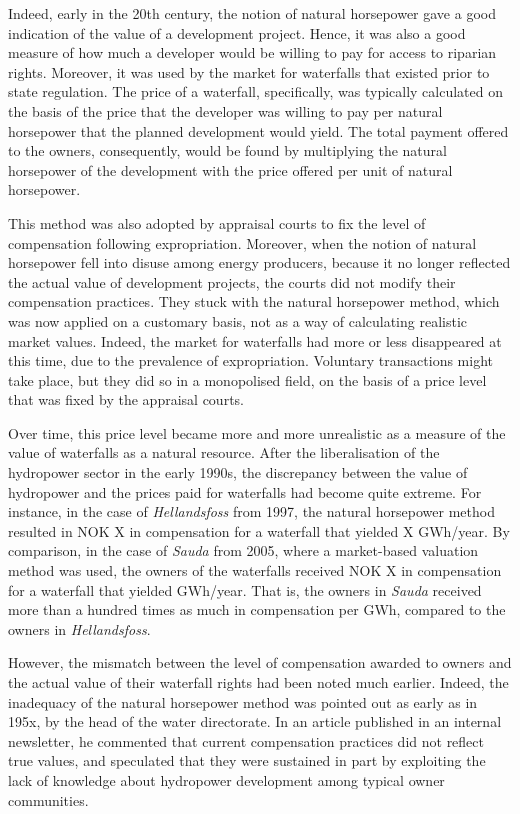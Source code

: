 Indeed, early in the 20th century, the notion of natural horsepower gave a good indication of the value of a development project. Hence, it was also a good measure of how much a developer would be willing to pay for access to riparian rights. Moreover, it was used by the market for waterfalls that existed prior to state regulation. The price of a waterfall, specifically, was typically calculated on the basis of the price that the developer was willing to pay per natural horsepower that the planned development would yield. The total payment offered to the owners, consequently, would be found by multiplying the natural horsepower of the development with the price offered per unit of natural horsepower.

This method was also adopted by appraisal courts to fix the level of compensation following expropriation. Moreover, when the notion of natural horsepower fell into disuse among energy producers, because it no longer reflected the actual value of development projects, the courts did not modify their compensation practices. They stuck with the natural horsepower method, which was now applied on a customary basis, not as a way of calculating realistic market values. Indeed, the market for waterfalls had more or less disappeared at this time, due to the prevalence of expropriation. Voluntary transactions might take place, but they did so in a monopolised field, on the basis of a price level that was fixed by the appraisal courts.

Over time, this price level became more and more unrealistic as a measure of the value of waterfalls as a natural resource. After the liberalisation of the hydropower sector in the early 1990s, the discrepancy between the value of hydropower and the prices paid for waterfalls had become quite extreme. For instance, in the case of {\it Hellandsfoss} from 1997, the natural horsepower method resulted in NOK X in compensation for a waterfall that yielded X GWh/year. By comparison, in the case of {\it Sauda} from 2005, where a market-based valuation method was used, the owners of the waterfalls received NOK X in compensation for a waterfall that yielded GWh/year. That is, the owners in {\it Sauda} received more than a hundred times as much in compensation per GWh, compared to the owners in {\it Hellandsfoss}.

However, the mismatch between the level of compensation awarded to owners and the actual value of their waterfall rights had been noted much earlier. Indeed, the inadequacy of the natural horsepower method was pointed out as early as in 195x, by the head of the water directorate. In an article published in an internal newsletter, he commented that current compensation practices did not reflect true values, and speculated that they were sustained in part by exploiting the lack of knowledge about hydropower development among typical owner communities.

